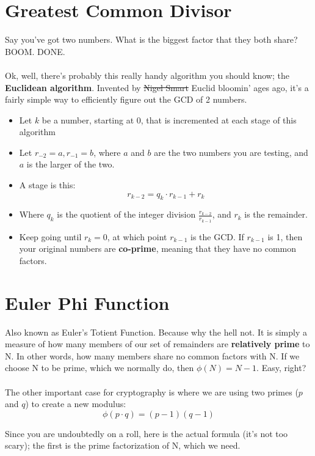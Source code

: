     \section{Greatest Common Divisor}
    Say you've got two numbers. What is the biggest factor that they both share? BOOM. DONE.\\
    \\
    Ok, well, there's probably this really handy algorithm you should know; the \textbf{Euclidean algorithm}. Invented by \sout{Nigel Smart} Euclid bloomin' ages ago, it's a fairly simple way to efficiently figure out the GCD of 2 numbers.
        \begin{itemize}
            \item Let $k$ be a number, starting at 0, that is incremented at each stage of this algorithm
            \item Let $r_{-2} = a, r_{-1} = b$, where $a$ and $b$ are the two numbers you are testing, and $a$ is the larger of the two.
            \item A stage is this: 
                $$
                    r_{k-2} = q_{k} \cdot r_{k-1} + r_{k}
                $$
            \item Where $q_{k}$ is the quotient of the integer division $\frac{r_{k-2}}{r_{k-1}}$, and $r_{k}$ is the remainder.
            \item Keep going until $r_{k} = 0$, at which point $r_{k-1}$ is the GCD. If $r_{k-1}$ is 1, then your original numbers are \textbf{co-prime}, meaning that they have no common factors.
        \end{itemize}
    
    \section{Euler Phi Function}
    Also known as Euler's Totient Function. Because why the hell not. It is simply a measure of how many members of our set of remainders are \textbf{relatively prime} to N. In other words, how many members share no common factors with N. If we choose N to be prime, which we normally do, then $\phi(N) = N - 1$. Easy, right?\\
    \\
    The other important case for cryptography is where we are using two primes ($p$ and $q$) to create a new modulus:
    $$ \phi(p \cdot q) = (p-1)(q-1)$$

    Since you are undoubtedly on a roll, here is the actual formula (it's not too scary); the first is the prime factorization of N, which we need.

